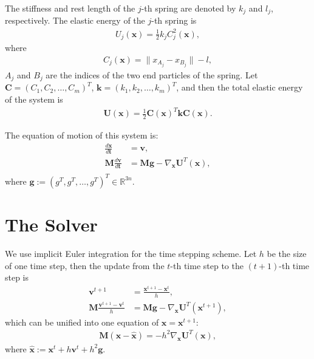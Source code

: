 \documentclass[conference]{IEEEtran}
\begin{document}
The stiffness and rest length of the $j$-th spring are denoted by $k_j$ and $l_j$, respectively. The elastic energy of the $j$-th spring is 
\begin{align}
    U_j(\mathbf x) = \frac12 k_j C_j^2(\mathbf x), 
\end{align}
where
\begin{align}
    C_j(\mathbf x) = \|x_{A_j} - x_{B_j} \| - l,
\end{align}
$A_j$ and $B_j$ are the indices of the two end particles of the spring. Let $\mathbf C = (C_1, C_2, \ldots, C_m)^T$, $\mathbf k = (k_1, k_2, \ldots, k_m)^T$, and then the total elastic energy of the system is
\begin{align}
    \mathbf U (\mathbf x) = \frac12 \mathbf C(\mathbf x)^T \mathbf k \mathbf C (\mathbf x).
\end{align}

The equation of motion of this system is:
\begin{align}
    \frac{d \mathbf x}{d \mathbf t} &= \mathbf v, \\
    \mathbf M \frac{d \mathbf v}{d \mathbf t} &= \mathbf M \mathbf g - \nabla_{\mathbf x} \mathbf U ^T (\mathbf x), \\
\end{align}
where $\mathbf g := (g^T, g^T, \ldots, g^T)^T \in \mathbb R^{3n}$. 

\section{The Solver}

We use implicit Euler integration for the time stepping scheme. Let $h$ be the size of one time step, then the update from the $t$-th time step to the $(t+1)$-th time step is
\begin{align}
    \mathbf v^{t+1} &= \frac{\mathbf x^{t+1} - \mathbf x^{t}}{h}, \\
    \mathbf M \frac{\mathbf v^{t+1} - \mathbf v^t}{h} &= \mathbf M \mathbf g - \nabla_{\mathbf x} \mathbf U ^T (\mathbf x^{t + 1}),
\end{align}
which can be unified into one equation of $\mathbf x = \mathbf x^{t+1}$:
\begin{align}
    \mathbf M (\mathbf x - \mathbf {\hat x}) = - h^2 \nabla_{\mathbf x} \mathbf U ^T (\mathbf x), \label{eq:implicit_x}
\end{align}
where $\mathbf{\hat x} := \mathbf x^t + h \mathbf v^t + h^2 \mathbf g$. 
\end{document}
